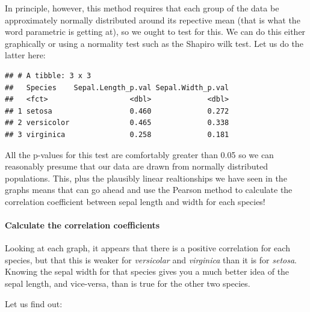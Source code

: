 \documentclass[
]{article}
\newenvironment{Shaded}{\begin{snugshade}}{\end{snugshade}}
\newcommand{\AttributeTok}[1]{\textcolor[rgb]{0.13,0.29,0.53}{#1}}
\newcommand{\DecValTok}[1]{\textcolor[rgb]{0.00,0.00,0.81}{#1}}
\newcommand{\FloatTok}[1]{\textcolor[rgb]{0.00,0.00,0.81}{#1}}
\newcommand{\FunctionTok}[1]{\textcolor[rgb]{0.13,0.29,0.53}{\textbf{#1}}}
\newcommand{\NormalTok}[1]{#1}
\newcommand{\OtherTok}[1]{\textcolor[rgb]{0.56,0.35,0.01}{#1}}
\newcommand{\SpecialCharTok}[1]{\textcolor[rgb]{0.81,0.36,0.00}{\textbf{#1}}}
\newcommand{\StringTok}[1]{\textcolor[rgb]{0.31,0.60,0.02}{#1}}
\begin{document}
In principle, however, this method requires that each group of the data
be approximately normally distributed around its repective mean (that is
what the word parametric is getting at), so we ought to test for this.
We can do this either graphically or using a normality test such as the
Shapiro wilk test. Let us do the latter here:

\begin{verbatim}
## # A tibble: 3 x 3
##   Species    Sepal.Length_p.val Sepal.Width_p.val
##   <fct>                   <dbl>             <dbl>
## 1 setosa                  0.460             0.272
## 2 versicolor              0.465             0.338
## 3 virginica               0.258             0.181
\end{verbatim}

All the p-values for this test are comfortably greater than 0.05 so we
can reasonably presume that our data are drawn from normally distributed
populations. This, plus the plausibly linear realtionships we have seen
in the graphs means that can go ahead and use the Pearson method to
calculate the correlation coefficient between sepal length and width for
each species!

\paragraph{Calculate the correlation
coefficients}\label{calculate-the-correlation-coefficients}

Looking at each graph, it appears that there is a positive correlation
for each species, but that this is weaker for \emph{versicolar} and
\emph{virginica} than it is for \emph{setosa}. Knowing the sepal width
for that species gives you a much better idea of the sepal length, and
vice-versa, than is true for the other two species.

Let us find out:

\begin{Shaded}
\end{Shaded}
\end{document}
